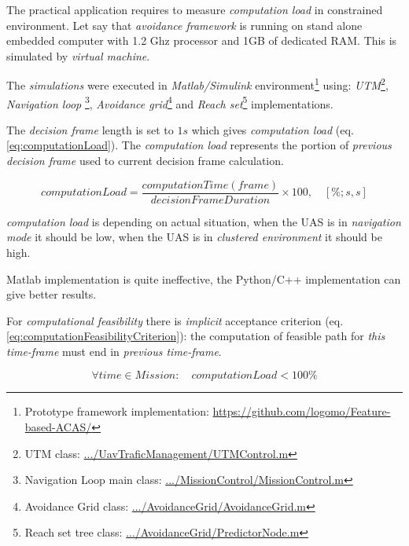 The practical application requires to measure \emph{computation load} in constrained environment. Let say that \emph{avoidance framework} is running on stand alone embedded computer with 1.2 Ghz processor and 1GB of dedicated RAM. This is simulated by \emph{virtual machine}.

The \emph{simulations} were executed in \emph{Matlab/Simulink} environment\footnote{Prototype framework implementation: \url{https://github.com/logomo/Feature-based-ACAS/}} using: \emph{UTM}\footnote{UTM  class: \url{.../UavTraficManagement/UTMControl.m}}, \emph{Navigation loop} \footnote{Navigation Loop main class: \url{.../MissionControl/MissionControl.m}}, \emph{Avoidance grid}\footnote{Avoidance Grid class: \url{.../AvoidanceGrid/AvoidanceGrid.m}} and \emph{Reach set}\footnote{Reach set tree class: \url{.../AvoidanceGrid/PredictorNode.m}} implementations. 

The \emph{decision frame} length is set to $1 s$ which gives \emph{computation load} (eq. \ref{eq:computationLoad}). The \emph{computation load} represents the portion of \emph{previous decision frame} used to current decision frame calculation.

\begin{equation}\label{eq:computationLoad}
    computationLoad=\frac{computationTime(frame)}{decisionFrameDuration}\times 100, \quad [\%;s,s]
\end{equation}

\begin{note}
    \emph{computation load} is depending on actual situation, when the UAS is in \emph{navigation mode} it should be low, when the UAS is in \emph{clustered environment} it should be high.
    
    Matlab implementation is quite ineffective, the Python/C++ implementation can give better results.
    
    For \emph{computational feasibility} there is \emph{implicit} acceptance criterion (eq. \ref{eq:computationFeasibilityCriterion}): the computation of feasible path for \emph{this time-frame} must end in \emph{previous time-frame}.
    
    \begin{equation}\label{eq:computationFeasibilityCriterion}
        \forall time \in Mission:\quad computation Load < 100\%
    \end{equation}    
\end{note}